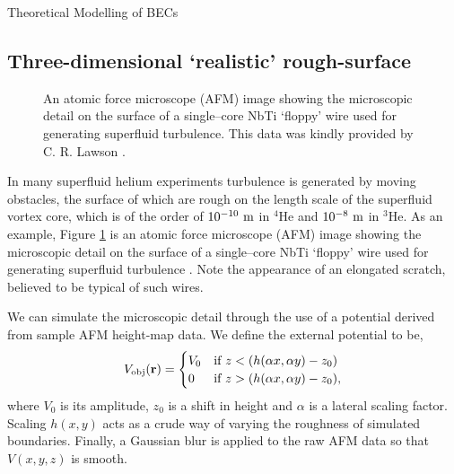\begin{chapter}{\label{cha:theoretical_model}Theoretical Modelling of BECs}
\subsection{\label{section:3dafmpotential} Three-dimensional `realistic' rough-surface}
\begin{figure}
	\centering
  \caption{An atomic force microscope (AFM) image showing the microscopic detail on the surface of a  single--core NbTi `floppy' wire used for generating superfluid turbulence. This data was kindly provided by C. R. Lawson \cite{Lawson}.}\label{fig_afmprofile}
 \end{figure}

In many superfluid helium experiments \cite{VinenSkrbek2008} turbulence is generated by moving obstacles, the surface of which are rough on the length scale of the superfluid vortex core, which is of
the order of $10^{-10}~\rm m$ in $^4$He
and $10^{-8}~\rm m$ in $^3$He.  As an example, Figure \ref{fig_afmprofile} is an atomic force microscope (AFM) image showing the microscopic detail on the surface of a  single--core NbTi `floppy' wire used for generating superfluid turbulence  \cite{Bradley2011}.  Note the appearance of an elongated scratch, believed to be typical of such wires.

We can simulate the microscopic detail through the use of a potential derived from sample AFM height-map data. We define the external potential to be,
\begin{equation}
V_{\mathrm{obj}}({\bf r}) =
\begin{cases}
V_0 &\mbox{if } z < (h(\alpha x,\alpha y)-z_0)  \\
0 &\mbox{if } z > (h(\alpha x,\alpha y)-z_0),
\end{cases}
\label{eq:potentialAFM3D}
\end{equation}
where $V_0$ is its amplitude, $z_0$ is a shift in height and $\alpha$ is a lateral scaling factor. Scaling $h(x,y)$ acts as a crude way of varying 
the roughness of simulated boundaries. Finally, a Gaussian blur is applied to the raw AFM data so that $V(x,y,z)$ is smooth.

\end{chapter}
